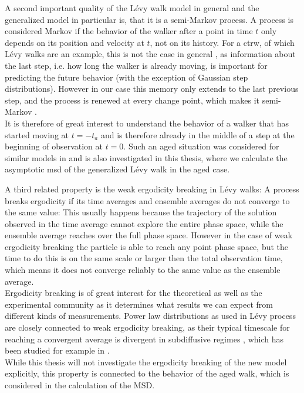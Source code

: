 A second important quality of the L\'evy walk model in general and the generalized model in particular is, that it is a semi-Markov process. A process is considered Markov if the behavior of the walker after a point in time $t$ only depends on its position and velocity at $t$, not on its history. For a \gls*{ctrw}, of which L\'evy walks are an example, this is not the case in general 
\cite{firstSteps}, 
as information about the last step, i.e. how long the walker is already moving, is important for predicting the future behavior (with the exception of Gaussian step distributions). However in our case this memory only extends to the last previous step, and the process is renewed at every change point, which makes it semi-Markov 
\cite{lwreview}.\\
It is therefore of great interest to understand the behavior of a walker that has started moving at $t=-t_a$ and is therefore already in the middle of a step at the beginning of observation at $t=0$. Such an aged situation was considered for similar models in
\cite{barkai2003a, barkai2003b} 
and is also investigated in this thesis, where we calculate the asymptotic  \gls*{msd} of the generalized L\'evy walk in the aged case.

A third related property is the weak ergodicity breaking in L\'evy walks: A process breaks ergodicity if its time averages and ensemble averages do not converge to the same value: This usually happens because the trajectory of the solution observed in the time average cannot explore the entire phase space, while the ensemble average reaches over the full phase space. 
However in the case of weak ergodicity breaking the particle is able to reach any point phase space, but the time to do this is on the same scale or larger then the total observation time, which means it does not converge reliably to the same value as the ensemble average. \\
Ergodicity breaking is of great interest for the theoretical as well as the experimental community as it determines what results we can expect from different kinds of measurements. Power law distributions as used in L\'evy process are closely connected to weak ergodicity breaking, as their typical timescale for reaching a convergent average is divergent in subdiffusive regimes 
\cite{anomalousTransport}, 
which has been studied for example in 
\cite{brokmann2003,radons2018}.\\
While this thesis will not investigate the ergodicity breaking of the new model explicitly, this property is connected to the behavior of the aged walk, which is considered in the calculation of the MSD. 

